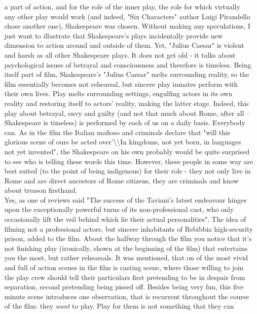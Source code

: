 \documentclass[10pt]{article}
\begin{document}
a part of action, and for the role of the inner play, the role for which virtually any other play would work (and indeed, "Six Characters" author
Luigi Pirandello chose another one), Shakespeare was chosen. Without making any speculations, I just want to illustrate that Shakespeare's plays
incidentally provide new dimension to action around and outside of them. Yet, "Julius Caesar" is violent and harsh as all other Shakespeare plays.
It does not get old - it talks about psychological issues of betrayal and consciousness and therefore is timeless. Being itself part of film,
Shakespeare's "Julius Caesar" melts surrounding reality, so the film essentially becomes not rehearsal, but sincere play inmates perform with their
own lives. Play melts surrounding settings, engulfing actors in its own reality and restoring itself to actors' reality, making the latter stage.
Indeed, this play about betrayal, envy and guilty (and not that much about Rome, after all -- Shakespeare is timeless) is performed by each
of us on a daily basis. Everybody can. As in the film the Italian mafioso and criminals declare that "will this glorious scene of ours be acted
over'\textbackslash\textbackslash In kingdoms, not yet born, in languages not yet invented", the Shakespeare on his own probably would be quite
surprised to see who is telling these words this time. 
However, these people in some way are best suited (to the point of being indigenous)
for their role - they not only live in Rome and are direct ancestors of Rome citizens, they are criminals and know about treason firsthand.\\
Yes, as one of reviews said "The success of the Taviani's latest endeavour hinges upon the exceptionally powerful turns of its
non-professional cast, who only occasionally lift the veil behind which lie their actual personalities". The idea of filming not a professional
actors, but sincere inhabitants of Rebibbia high-security prison, added to the film. About the halfway through the film you notice that it's
not finishing play (ironically, shown at the beginning of the film) that entertains you the most, but rather rehearsals. It was mentioned, that
on of the most vivid and full of action scenes in the film is casting scene, where those willing to join the play crew should tell their particulars
first pretending to be in despair from separation, second pretending being pissed off. Besides being very fun, this five minute scene introduces
one observation, that is recurrent throughout the course of the film: they \textit{want} to play. Play for them is not something that they can 
\end{document}
